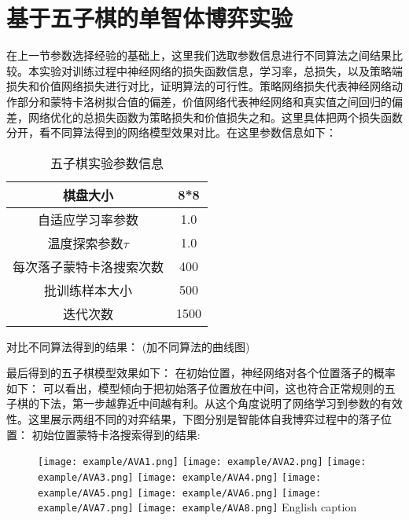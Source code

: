 \section{基于五子棋的单智体博弈实验}

在上一节参数选择经验的基础上，这里我们选取参数信息进行不同算法之间结果比较。本实验对训练过程中神经网络的损失函数信息，学习率，总损失，以及策略端损失和价值网络损失进行对比，证明算法的可行性。策略网络损失代表神经网络动作部分和蒙特卡洛树拟合值的偏差，价值网络代表神经网络和真实值之间回归的偏差，网络优化的总损失函数为策略损失和价值损失之和。这里具体把两个损失函数分开，看不同算法得到的网络模型效果对比。在这里参数信息如下：
\begin{table}
	\centering
	\caption{五子棋实验参数信息}
	\begin{tabular}{c|c}
		\hline 
		棋盘大小 & 8*8 \\ 
		\hline 
		自适应学习率参数 & 1.0 \\ 
		\hline 
		温度探索参数$\tau$& 1.0 \\ 
		\hline 
		每次落子蒙特卡洛搜索次数 & 400 \\ 
		\hline 
		批训练样本大小 & 500 \\ 
		\hline 
		迭代次数 & 1500 \\ 
		\hline 
	\end{tabular} 
\end{table}


对比不同算法得到的结果：
(加不同算法的曲线图)

最后得到的五子棋模型效果如下：
在初始位置，神经网络对各个位置落子的概率如下：
可以看出，模型倾向于把初始落子位置放在中间，这也符合正常规则的五子棋的下法，第一步越靠近中间越有利。从这个角度说明了网络学习到参数的有效性。这里展示两组不同的对弈结果，下图分别是智能体自我博弈过程中的落子位置：
初始位置蒙特卡洛搜索得到的结果:

\begin{figure}[htpb]
	\centering
	\texttt{[image: example/AVA1.png]}
	\hspace{0.5cm}
	\texttt{[image: example/AVA2.png]}
	\hspace{0.5cm}
	\texttt{[image: example/AVA3.png]}
	\hspace{0.5cm}
	\texttt{[image: example/AVA4.png]}
	\hspace{0.5cm}
	\texttt{[image: example/AVA5.png]}
	\hspace{0.5cm}
	\texttt{[image: example/AVA6.png]}
	\hspace{0.5cm}
	\texttt{[image: example/AVA7.png]}
	\hspace{0.5cm}
	\texttt{[image: example/AVA8.png]}
	{English caption}
	\label{fig:AIvsAI}
\end{figure}

